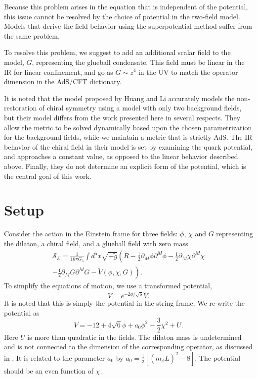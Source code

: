 \documentclass[aps,prd,12pt,nofootinbib]{revtex4}
\newcommand{\be}{\begin{equation}}
\newcommand{\ee}{\end{equation}}
\newcommand{\ba}{\begin{eqnarray}}
\newcommand{\ea}{\end{eqnarray}}
\def\thalf{{\textstyle{\frac{1}{2}}}}
\def\tthalf{{\textstyle{\frac{3}{2}}}}
\def\rt6{\sqrt{6}}
\def\mL2{(m_{\phi}L)^2}
\newcommand{\cS}{\mathcal S}
\begin{document}
Because this problem arises in the equation that is independent of the potential, this issue cannot be resolved by the choice of potential in the two-field model. 
Models that derive the field behavior using the superpotential method suffer from the same problem.

To resolve this problem, we suggest to add an additional scalar field to the model, $G$, representing the glueball condensate. 
This field must be linear in the IR for linear confinement, and go as $G \sim z^4$ in the UV to match the operator dimension in the AdS/CFT dictionary.

It is noted that the model proposed by Huang and Li \cite{Li2013, Li2013a} accurately models the non-restoration of chiral symmetry using a model with only two background fields, but their model differs from the work presented here in several respects.
They allow the metric to be solved dynamically based upon the chosen parametrization for the background fields, while we maintain a metric that is strictly AdS.
The IR behavior of the chiral field in their model is set by examining the quark potential, and approaches a constant value, as opposed to the linear behavior described above.
Finally, they do not determine an explicit form of the potential, which is the central goal of this work.


\section{Setup}

Consider the action in the Einstein frame for three fields: $\phi$, $\chi$ and $G$ representing the dilaton, a chiral field, and a glueball field with zero mass
\ba
\cS_E=\frac{1}{16\pi G_5} \int d^5x \sqrt{-\tilde{g}}\left(\tilde{R}-\thalf\partial_M\phi\partial^M\phi -\thalf\partial_M\chi\partial^M\chi \right. \\ \nonumber
 \left. -\thalf\partial_M G\partial^M G - \tilde{V}(\phi,\chi,G)\right).
\ea
To simplify the equations of motion, we use a transformed potential, 
\be
V=e^{-2\phi/\rt6}\tilde{V}.
\label{transform}
\ee
It is noted that this is simply the potential in the string frame.
We re-write the potential as
\be
V = -12 + 4\sqrt{6}\phi + a_0\phi^2 -\tthalf\chi^2 + U.
\label{V}
\ee
Here $U$ is more than quadratic in the fields.  
The dilaton mass is undetermined and is not connected to the dimension of the corresponding operator, as discussed in \cite{Springer2010}.  
It is related to the parameter $a_0$ by $a_0 = \thalf \left[ \mL2-8 \right]$. 
The potential should be an even function of $\chi$. 
\end{document}
